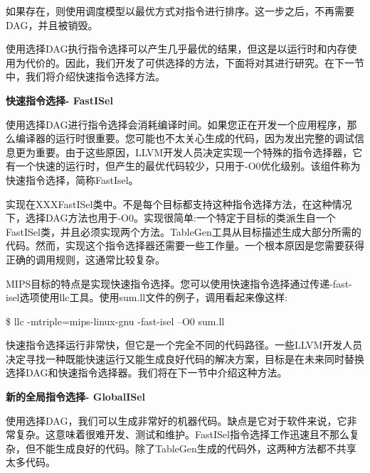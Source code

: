 如果存在，则使用调度模型以最优方式对指令进行排序。这一步之后，不再需要DAG，并且被销毁。\par

使用选择DAG执行指令选择可以产生几乎最优的结果，但这是以运行时和内存使用为代价的。因此，我们开发了可供选择的方法，下面将对其进行研究。在下一节中，我们将介绍快速指令选择方法。\par

\hspace*{\fill} \par %
\textbf{快速指令选择- FastISel}

使用选择DAG进行指令选择会消耗编译时间。如果您正在开发一个应用程序，那么编译器的运行时很重要。您可能也不太关心生成的代码，因为发出完整的调试信息更为重要。由于这些原因，LLVM开发人员决定实现一个特殊的指令选择器，它有一个快速的运行时，但产生的最优代码较少，只用于-O0优化级别。该组件称为快速指令选择，简称FastIsel。\par

实现在XXXFastISel类中。不是每个目标都支持这种指令选择方法，在这种情况下，选择DAG方法也用于-O0。实现很简单:一个特定于目标的类派生自一个FastISel类，并且必须实现两个方法。TableGen工具从目标描述生成大部分所需的代码。然而，实现这个指令选择器还需要一些工作量。一个根本原因是您需要获得正确的调用规则，这通常比较复杂。\par

MIPS目标的特点是实现快速指令选择。您可以使用快速指令选择通过传递-fast-isel选项使用llc工具。使用sum.ll文件的例子，调用看起来像这样:\par

\begin{tcolorbox}[colback=white,colframe=black]
\$ llc -mtriple=mips-linux-gnu -fast-isel –O0 sum.ll
\end{tcolorbox}

快速指令选择运行非常快，但它是一个完全不同的代码路径。一些LLVM开发人员决定寻找一种既能快速运行又能生成良好代码的解决方案，目标是在未来同时替换选择DAG和快速指令选择器。我们将在下一节中介绍这种方法。\par

\hspace*{\fill} \par %
\textbf{新的全局指令选择- GlobalISel}

使用选择DAG，我们可以生成非常好的机器代码。缺点是它对于软件来说，它非常复杂。这意味着很难开发、测试和维护。FastISel指令选择工作迅速且不那么复杂，但不能生成良好的代码。除了TableGen生成的代码外，这两种方法都不共享太多代码。\par

